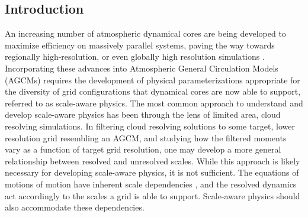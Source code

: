 \subsection{Introduction}

An increasing number of atmospheric dynamical cores are being developed to maximize efficiency on massively parallel systems, paving the way towards regionally high-resolution, or even globally high resolution simulations \citep[approximately $\Delta x = 50$ km or less;][]{Z2014QJRMS,HETAL2016JCLIM,LetAl2018JAMES}. Incorporating these advances into Atmospheric General Circulation Models (AGCMs) requires the development of physical parameterizations appropriate for the diversity of grid configurations that dynamical cores are now able to support, referred to as scale-aware physics. The most common approach to understand and develop scale-aware physics has been through the lens of limited area, cloud resolving simulations. In filtering cloud resolving solutions to some target, lower resolution grid resembling an AGCM, and studying how the filtered moments vary as a function of target grid resolution, one may develop a more general relationship between resolved and unresolved scales. While this approach is likely necessary for developing scale-aware physics, it is not sufficient. The equations of motions of motion have inherent scale dependencies \citep{O1981JAS,WETAL1997MWR,PG2006JAS,JR2016QJRMS}, and the resolved dynamics act accordingly to the scales a grid is able to support. Scale-aware physics should also accommodate these dependencies.

